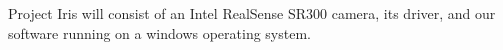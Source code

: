 
Project Iris will consist of an Intel RealSense SR300 camera, its driver, and our software running on a windows operating system. 
